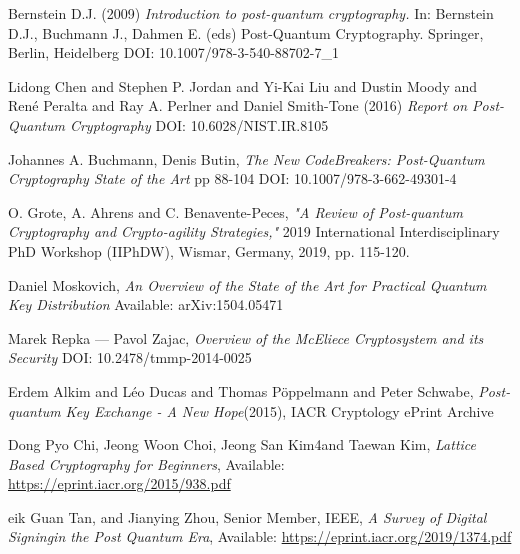 \documentclass[journal]{IEEEtran}
\begin{document}
%
%
%
\begin{thebibliography}{1}


\bibitem{}
Bernstein D.J. (2009) \emph{Introduction to post-quantum cryptography.}
  In: Bernstein D.J., Buchmann J., Dahmen E. (eds) Post-Quantum Cryptography. Springer, Berlin, Heidelberg DOI: 10.1007/978-3-540-88702-7\_1


\bibitem{}
Lidong Chen and Stephen P. Jordan and Yi-Kai Liu and Dustin Moody and Ren{\'e} Peralta and Ray A. Perlner and Daniel Smith-Tone (2016)
  \emph{Report on Post-Quantum Cryptography} DOI: 10.6028/NIST.IR.8105

\bibitem{}
Johannes A. Buchmann, Denis Butin, \emph{The New CodeBreakers: Post-Quantum Cryptography State of the Art} pp 88-104 DOI: 10.1007/978-3-662-49301-4

\bibitem{}
O. Grote, A. Ahrens and C. Benavente-Peces, \emph{"A Review of Post-quantum Cryptography and Crypto-agility Strategies,"} 2019 International Interdisciplinary PhD Workshop (IIPhDW), 
Wismar, Germany, 2019, pp. 115-120.

\bibitem{}
Daniel Moskovich, \emph{An Overview of the State of the Art for Practical Quantum Key Distribution} Available: arXiv:1504.05471

\bibitem{}
Marek Repka — Pavol Zajac, \emph{Overview of the McEliece Cryptosystem and its Security} DOI: 10.2478/tmmp-2014-0025

\bibitem{}
Erdem Alkim and L{\'e}o Ducas and Thomas P{\"o}ppelmann and Peter Schwabe, \emph{Post-quantum Key Exchange - A New Hope}(2015), IACR Cryptology ePrint Archive

\bibitem{}
Dong Pyo Chi, Jeong Woon Choi, Jeong San Kim4and Taewan Kim, \emph{Lattice Based Cryptography for Beginners}, Available: \url{https://eprint.iacr.org/2015/938.pdf}

\bibitem{}
eik Guan Tan, and Jianying Zhou, Senior Member, IEEE, \emph{A Survey of Digital Signingin the Post Quantum Era}, Available: \url{https://eprint.iacr.org/2019/1374.pdf}

\end{thebibliography}
\end{document}
